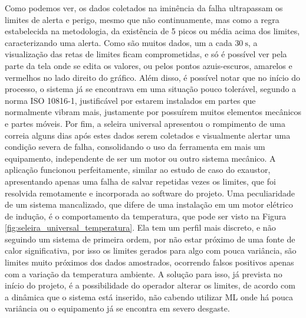 Como podemos ver, os dados coletados na iminência da falha ultrapassam os limites de alerta e perigo, mesmo que não continuamente, mas
como a regra estabelecida na metodologia, da existência de 5 picos ou média acima dos limites, caracterizando uma alerta. Como são muitos dados,
um a cada $\SI{30}{\second}$, a visualização das retas de limites ficam comprometidas, e só é possível ver pela parte da tela onde se edita os
valores, ou pelos pontos azuis-escuros, amarelos e vermelhos no lado direito do gráfico. Além disso, é possível notar que no início do processo,
o sistema já se encontrava em uma situação pouco tolerável, segundo a norma ISO 10816-1, justificável por estarem instalados em partes que 
normalmente vibram mais, justamente por possuírem muitos elementos mecânicos e partes móveis. Por fim, a seleira universal apresentou o rompimento de uma
correia alguns dias após estes dados serem coletados e visualmente alertar uma condição severa de falha, consolidando o uso da ferramenta em
mais um equipamento, independente de ser um motor ou outro sistema mecânico. A aplicação funcionou perfeitamente, similar ao estudo de caso do
exaustor, apresentando apenas uma falha de salvar repetidas vezes os limites, que foi resolvida remotamente e incorporada ao software do projeto.
Uma peculiaridade de um sistema mancalizado, que difere de uma instalação em um motor elétrico de indução, é o comportamento da temperatura,
que pode ser visto na Figura \ref{fig:seleira_universal_temperatura}. 
Ela tem um perfil mais discreto, e não seguindo um sistema de primeira ordem, por não estar próximo de uma fonte de calor significativa, por isso
os limites gerados para algo com pouca variância, são limites muito próximos dos dados amostrados, ocorrendo falsos positivos apenas com a
variação da temperatura ambiente. A solução para isso, já prevista no início do projeto, é a possibilidade do operador alterar os limites, de 
acordo com a dinâmica que o sistema está inserido, não cabendo utilizar  ML onde há pouca variância ou o equipamento já se 
encontra em severo desgaste. 

